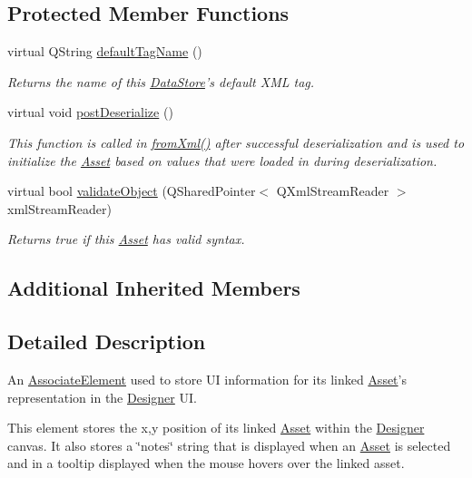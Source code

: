 \subsection*{Protected Member Functions}
\begin{DoxyCompactItemize}
\item 
virtual Q\-String \hyperlink{class_picto_1_1_u_i_element_a28fde2928109438a808d132e5b72837a}{default\-Tag\-Name} ()
\begin{DoxyCompactList}\small\item\em Returns the name of this \hyperlink{class_picto_1_1_data_store}{Data\-Store}'s default X\-M\-L tag. \end{DoxyCompactList}\item 
virtual void \hyperlink{class_picto_1_1_u_i_element_ab3ee48eff0c98d5ea16d6c38d261715d}{post\-Deserialize} ()
\begin{DoxyCompactList}\small\item\em This function is called in \hyperlink{class_picto_1_1_asset_a8bed4da09ecb1c07ce0dab313a9aba67}{from\-Xml()} after successful deserialization and is used to initialize the \hyperlink{class_picto_1_1_asset}{Asset} based on values that were loaded in during deserialization. \end{DoxyCompactList}\item 
virtual bool \hyperlink{class_picto_1_1_u_i_element_ade6fd5f061f44ac8d87fc320cf77c4af}{validate\-Object} (Q\-Shared\-Pointer$<$ Q\-Xml\-Stream\-Reader $>$ xml\-Stream\-Reader)
\begin{DoxyCompactList}\small\item\em Returns true if this \hyperlink{class_picto_1_1_asset}{Asset} has valid syntax. \end{DoxyCompactList}\end{DoxyCompactItemize}
\subsection*{Additional Inherited Members}


\subsection{Detailed Description}
An \hyperlink{class_picto_1_1_associate_element}{Associate\-Element} used to store U\-I information for its linked \hyperlink{class_picto_1_1_asset}{Asset}'s representation in the \hyperlink{class_designer}{Designer} U\-I. 

This element stores the x,y position of its linked \hyperlink{class_picto_1_1_asset}{Asset} within the \hyperlink{class_designer}{Designer} canvas. It also stores a \char`\"{}notes\char`\"{} string that is displayed when an \hyperlink{class_picto_1_1_asset}{Asset} is selected and in a tooltip displayed when the mouse hovers over the linked asset.

